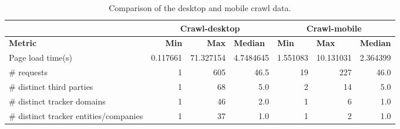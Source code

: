 \begin{table}[ht] 
\caption{Comparison of the desktop and mobile crawl data.} 
\centering 
\begin{tabular}{|l|rrl|lll|} 
\hline 
\textbf{} & \multicolumn{3}{c|}{\textbf{Crawl-desktop}} & \multicolumn{3}{c|}{\textbf{Crawl-mobile}} \\ \hline 
\textbf{Metric} & \multicolumn{1}{r|}{\textbf{Min}} & \multicolumn{1}{r|}{\textbf{Max}} & \textbf{Median} & \multicolumn{1}{l|}{\textbf{Min}} & \multicolumn{1}{l|}{\textbf{Max}} & \textbf{Median} \\ \hline 
Page load time(s) & \multicolumn{1}{r|}{0.117661} & \multicolumn{1}{r|}{71.327154} & \multicolumn{1}{r|}{4.7484645} & \multicolumn{1}{r|}{1.551083} & \multicolumn{1}{r|}{10.131031} & \multicolumn{1}{r|}{2.364399} \\ \hline 
\# requests & \multicolumn{1}{r|}{1} & \multicolumn{1}{r|}{605} & \multicolumn{1}{r|}{46.5} & \multicolumn{1}{r|}{19} & \multicolumn{1}{r|}{227} & \multicolumn{1}{r|}{46.0} \\ \hline 
\# distinct third parties & \multicolumn{1}{r|}{1} & \multicolumn{1}{r|}{68} & \multicolumn{1}{r|}{5.0} & \multicolumn{1}{r|}{2} & \multicolumn{1}{r|}{14} & \multicolumn{1}{r|}{5.0} \\ \hline 
\# distinct tracker domains & \multicolumn{1}{r|}{1} & \multicolumn{1}{r|}{46} & \multicolumn{1}{r|}{2.0} & \multicolumn{1}{r|}{1} & \multicolumn{1}{r|}{6} & \multicolumn{1}{r|}{1.0} \\ \hline 
\# distinct tracker entities/companies & \multicolumn{1}{r|}{1} & \multicolumn{1}{r|}{37} & \multicolumn{1}{r|}{1.0} & \multicolumn{1}{r|}{1} & \multicolumn{1}{r|}{2} & \multicolumn{1}{r|}{1.0} \\ \hline 
\end{tabular} 
\label{table:Comparison} 
\end{table}